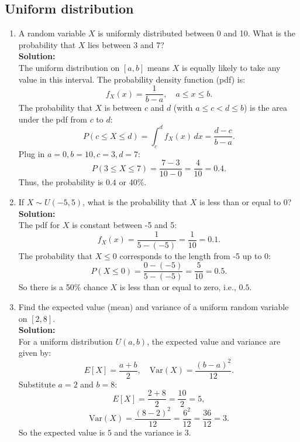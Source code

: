 \documentclass{book}
\begin{document}
\subsection*{Uniform distribution}

\begin{enumerate}

    \item A random variable \(X\) is uniformly distributed between 0 and 10. What is the probability that \(X\) lies between 3 and 7? \\
    
    \textbf{Solution:} \\
    
    The uniform distribution on \([a,b]\) means \(X\) is equally likely to take any value in this interval. The probability density function (pdf) is:
    \[
    f_X(x) = \frac{1}{b-a}, \quad a \leq x \leq b.
    \]
    The probability that \(X\) is between \(c\) and \(d\) (with \(a \leq c < d \leq b\)) is the area under the pdf from \(c\) to \(d\):
    \[
    P(c \leq X \leq d) = \int_c^d f_X(x) \, dx = \frac{d - c}{b - a}.
    \]
    Plug in \(a=0, b=10, c=3, d=7\):
    \[
    P(3 \leq X \leq 7) = \frac{7 - 3}{10 - 0} = \frac{4}{10} = 0.4.
    \]
    Thus, the probability is \(\boxed{0.4}\) or 40\%.

    \item If \(X \sim U(-5,5)\), what is the probability that \(X\) is less than or equal to 0? \\
    
    \textbf{Solution:} \\
    
    The pdf for \(X\) is constant between -5 and 5:
    \[
    f_X(x) = \frac{1}{5 - (-5)} = \frac{1}{10} = 0.1.
    \]
    The probability that \(X \leq 0\) corresponds to the length from -5 up to 0:
    \[
    P(X \leq 0) = \frac{0 - (-5)}{5 - (-5)} = \frac{5}{10} = 0.5.
    \]
    So there is a 50\% chance \(X\) is less than or equal to zero, i.e., \(\boxed{0.5}\).

    \item Find the expected value (mean) and variance of a uniform random variable on \([2,8]\). \\
    
    \textbf{Solution:} \\
    
    For a uniform distribution \(U(a,b)\), the expected value and variance are given by:
    \[
    E[X] = \frac{a + b}{2}, \quad \mathrm{Var}(X) = \frac{(b - a)^2}{12}.
    \]
    Substitute \(a=2\) and \(b=8\):
    \[
    E[X] = \frac{2 + 8}{2} = \frac{10}{2} = 5,
    \]
    \[
    \mathrm{Var}(X) = \frac{(8 - 2)^2}{12} = \frac{6^2}{12} = \frac{36}{12} = 3.
    \]
    So the expected value is \(\boxed{5}\) and the variance is \(\boxed{3}\).
    
\end{enumerate}
\end{document}
